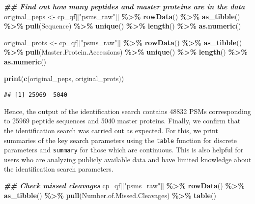 \documentclass[9pt,a4paper,]{extarticle}
\newenvironment{Shaded}{\begin{snugshade}}{\end{snugshade}}
\newcommand{\DocumentationTok}[1]{\textcolor[rgb]{0.56,0.35,0.01}{\textbf{\textit{#1}}}}
\newcommand{\FunctionTok}[1]{\textcolor[rgb]{0.13,0.29,0.53}{\textbf{#1}}}
\newcommand{\NormalTok}[1]{#1}
\newcommand{\OtherTok}[1]{\textcolor[rgb]{0.56,0.35,0.01}{#1}}
\newcommand{\SpecialCharTok}[1]{\textcolor[rgb]{0.81,0.36,0.00}{\textbf{#1}}}
\newcommand{\StringTok}[1]{\textcolor[rgb]{0.31,0.60,0.02}{#1}}
\begin{document}
\begin{Shaded}
\begin{Highlighting}[]
\DocumentationTok{\#\# Find out how many peptides and master proteins are in the data}
\NormalTok{original\_peps }\OtherTok{\textless{}{-}}\NormalTok{ cp\_qf[[}\StringTok{"psms\_raw"}\NormalTok{]] }\SpecialCharTok{\%\textgreater{}\%} 
  \FunctionTok{rowData}\NormalTok{() }\SpecialCharTok{\%\textgreater{}\%} 
  \FunctionTok{as\_tibble}\NormalTok{() }\SpecialCharTok{\%\textgreater{}\%} 
  \FunctionTok{pull}\NormalTok{(Sequence) }\SpecialCharTok{\%\textgreater{}\%} 
  \FunctionTok{unique}\NormalTok{() }\SpecialCharTok{\%\textgreater{}\%}
  \FunctionTok{length}\NormalTok{() }\SpecialCharTok{\%\textgreater{}\%}
  \FunctionTok{as.numeric}\NormalTok{()}

\NormalTok{original\_prots }\OtherTok{\textless{}{-}}\NormalTok{ cp\_qf[[}\StringTok{"psms\_raw"}\NormalTok{]] }\SpecialCharTok{\%\textgreater{}\%} 
  \FunctionTok{rowData}\NormalTok{() }\SpecialCharTok{\%\textgreater{}\%} 
  \FunctionTok{as\_tibble}\NormalTok{() }\SpecialCharTok{\%\textgreater{}\%} 
  \FunctionTok{pull}\NormalTok{(Master.Protein.Accessions) }\SpecialCharTok{\%\textgreater{}\%} 
  \FunctionTok{unique}\NormalTok{() }\SpecialCharTok{\%\textgreater{}\%}
  \FunctionTok{length}\NormalTok{() }\SpecialCharTok{\%\textgreater{}\%}
  \FunctionTok{as.numeric}\NormalTok{()}

\FunctionTok{print}\NormalTok{(}\FunctionTok{c}\NormalTok{(original\_peps, original\_prots))}
\end{Highlighting}
\end{Shaded}

\begin{verbatim}
## [1] 25969  5040
\end{verbatim}

Hence, the output of the identification search contains
48832 PSMs corresponding to
25969 peptide sequences and
5040 master proteins. Finally, we
confirm that the identification search was carried out as expected. For this, we
print summaries of the key search parameters using the \texttt{table} function for
discrete parameters and \texttt{summary} for those which are continuous. This is also
helpful for users who are analyzing publicly available data and have limited
knowledge about the identification search parameters.

\begin{Shaded}
\begin{Highlighting}[]
\DocumentationTok{\#\# Check missed cleavages}
\NormalTok{cp\_qf[[}\StringTok{"psms\_raw"}\NormalTok{]] }\SpecialCharTok{\%\textgreater{}\%}
  \FunctionTok{rowData}\NormalTok{() }\SpecialCharTok{\%\textgreater{}\%} 
  \FunctionTok{as\_tibble}\NormalTok{() }\SpecialCharTok{\%\textgreater{}\%} 
  \FunctionTok{pull}\NormalTok{(Number.of.Missed.Cleavages) }\SpecialCharTok{\%\textgreater{}\%} 
  \FunctionTok{table}\NormalTok{()}
\end{Highlighting}
\end{Shaded}
\end{document}
